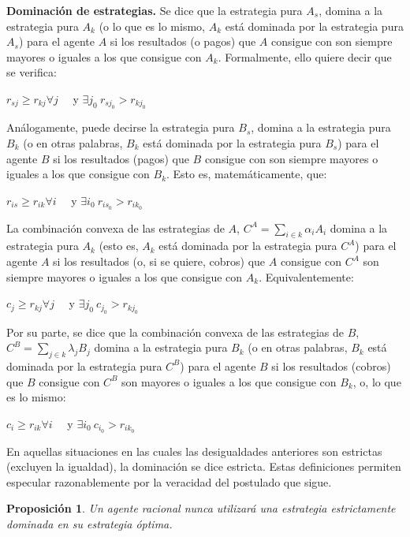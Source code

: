 \begin{definicion}\label{Def:Dom_estra}
\textbf{Dominación de estrategias.}
Se dice que la estrategia pura $A_s$, domina a la estrategia pura $A_k$ (o lo que es lo mismo, $A_k$ está dominada por la estrategia pura $A_s$)  para el agente $A$ si los resultados (o pagos) que $A$ consigue con  son siempre mayores o iguales a los que consigue con $A_k$.  Formalmente, ello quiere decir que se verifica:
\begin{center}
    $r_{sj} \geq r_{kj} \forall j \quad  $ y $\exists j_0 \: r_{sj_0} > r_{kj_0}$
\end{center}
Análogamente, puede decirse la estrategia pura $B_s$, domina a la estrategia pura $B_k$ (o en otras palabras, $B_k$ está dominada por la estrategia pura $B_s$)  para el agente $B$ si los resultados (pagos) que $B$ consigue con  son siempre mayores o iguales a los que consigue con $B_k$.  Esto es, matemáticamente, que: 
\begin{center}
    $ r_{is} \geq r_{ik} \forall i \quad  $ y $\exists i_0 \: r_{is_0} > r_{ik_0}$
\end{center}
La combinación convexa de las estrategias de $A$, $C^A = \underset{i\in k}{\sum}\alpha_i A_i$  domina a la estrategia pura $A_k$ (esto es, $A_k$ está dominada por la estrategia pura $C^A$)  para el agente $A$ si los resultados (o, si se quiere, cobros) que $A$ consigue con $C^A$ son siempre mayores o iguales a los que consigue con $A_k$.  Equivalentemente:
\begin{center}
    $ c_j \geq r_{kj} \forall j \quad  $ y $\exists j_0 \: c_{j_0} > r_{kj_0}$
\end{center}
Por su parte, se dice que la combinación convexa de las estrategias de $B$, $C^B = \underset{j\in k}{\sum}\lambda_j B_j$ domina a la estrategia pura $B_k$ (o en otras palabras, $B_k$ está dominada por la estrategia pura $C^B$)  para el agente $B$ si los resultados (cobros) que $B$ consigue con $C^B$ son mayores o iguales a los que consigue con $B_k$, o, lo que es lo mismo:
\begin{center}
    $ c_i \geq r_{ik} \forall i \quad  $ y $\exists i_0 \: c_{i_0} > r_{ik_0}$
\end{center}
En aquellas situaciones en las cuales las desigualdades anteriores son estrictas (excluyen la igualdad), la dominación se dice estricta.  Estas definiciones permiten especular razonablemente por la veracidad del postulado que sigue.
\end{definicion}
\newtheorem{proposicion}{Proposición}
\begin{proposicion}
Un agente racional nunca utilizará una estrategia estrictamente dominada en su estrategia óptima.
\end{proposicion}

